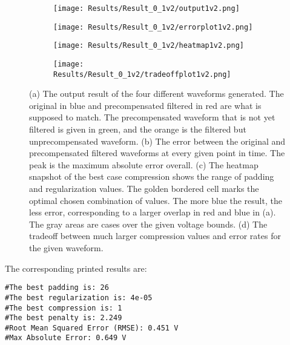 \documentclass[11pt, a4paper]{article}
\theoremstyle{definition}
\numberwithin{equation}{section}
\begin{document}
\begin{figure}[hbt!]
\centering
\begin{subfigure}{.45\linewidth}
  \centering
  \texttt{[image: Results/Result\_0\_1v2/output1v2.png]}
  \subcaption{}
  \label{output1v2}
\end{subfigure}
\quad
\begin{subfigure}{.45\linewidth}
  \centering
  \texttt{[image: Results/Result\_0\_1v2/errorplot1v2.png]}
  \subcaption{}
  \label{errorplot1v2}
\end{subfigure}
\begin{subfigure}{.45\linewidth}
  \centering
  \texttt{[image: Results/Result\_0\_1v2/heatmap1v2.png]}
  \subcaption{}
  \label{heatmap1v2}
\end{subfigure}
\quad
\begin{subfigure}{.45\linewidth}
  \centering
  \texttt{[image: Results/Result\_0\_1v2/tradeoffplot1v2.png]}
  \caption{}
  \label{tradeoffplot1v2}
\end{subfigure}
\caption{(a) The output result of the four different waveforms generated. The original in blue and precompensated filtered in red are what is supposed to match. The precompensated waveform that is not yet filtered is given in green, and the orange is the filtered but unprecompensated waveform. (b) The error between the original and precompensated filtered waveforms at every given point in time. The peak is the maximum absolute error overall. (c) The heatmap snapshot of the best case compression shows the range of padding and regularization values. The golden bordered cell marks the optimal chosen combination of values. The more blue the result, the less error, corresponding to a larger overlap in red and blue in (a). The gray areas are cases over the given voltage bounds. (d) The tradeoff between much larger compression values and error rates for the given waveform.}
\label{fig:1v2}
\end{figure}

The corresponding printed results are:

\begin{verbatim}
#The best padding is: 26
#The best regularization is: 4e-05
#The best compression is: 1
#The best penalty is: 2.249
#Root Mean Squared Error (RMSE): 0.451 V
#Max Absolute Error: 0.649 V
\end{verbatim}
\end{document}
